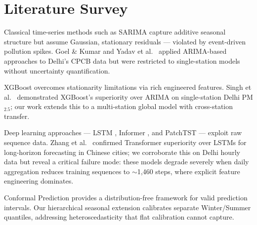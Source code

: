 \documentclass[11pt,a4paper]{article}
\begin{document}
\section{Literature Survey}
Classical time-series methods such as SARIMA \cite{sarima} capture additive seasonal structure but assume Gaussian, stationary residuals --- violated by event-driven pollution spikes. Goel \& Kumar \cite{goel2015} and Yadav et al.\ \cite{yadav2021} applied ARIMA-based approaches to Delhi's CPCB data but were restricted to single-station models without uncertainty quantification.

XGBoost \cite{xgboost} overcomes stationarity limitations via rich engineered features. Singh et al.\ \cite{singh2020} demonstrated XGBoost's superiority over ARIMA on single-station Delhi PM$_{2.5}$; our work extends this to a multi-station global model with cross-station transfer.

Deep learning approaches --- LSTM \cite{lstm}, Informer \cite{informer}, and PatchTST \cite{patchtst} --- exploit raw sequence data. Zhang et al.\ \cite{zhang2023} confirmed Transformer superiority over LSTMs for long-horizon forecasting in Chinese cities; we corroborate this on Delhi hourly data but reveal a critical failure mode: these models degrade severely when daily aggregation reduces training sequences to $\sim$1,460 steps, where explicit feature engineering dominates.

Conformal Prediction \cite{conformal} provides a distribution-free framework for valid prediction intervals. Our hierarchical seasonal extension calibrates separate Winter/Summer quantiles, addressing heteroscedasticity that flat calibration cannot capture.

\end{document}
